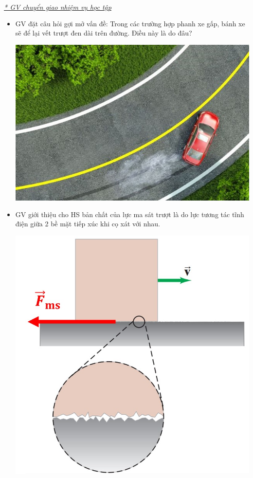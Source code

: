 {	\textit{\underline{* GV chuyển giao nhiệm vụ học tập}}
	\begin{itemize}[label=-]
		\item GV đặt câu hỏi gợi mở vấn đề: Trong các trường hợp phanh xe gấp, bánh xe sẽ để lại vết trượt đen dài trên đường. Điều này là do đâu?
		\begin{center}
			\includegraphics[scale=0.4]{figs/G10-BAI11-2}
		\end{center}
		\item GV giới thiệu cho HS bản chất của lực ma sát trượt là do lực tương tác tĩnh điện giữa 2 bề mặt tiếp xúc khi cọ xát với nhau.
		\begin{center}
			\includegraphics[scale=0.5]{figs/G10-BAI11-3}

\end{center}
\end{itemize}}
